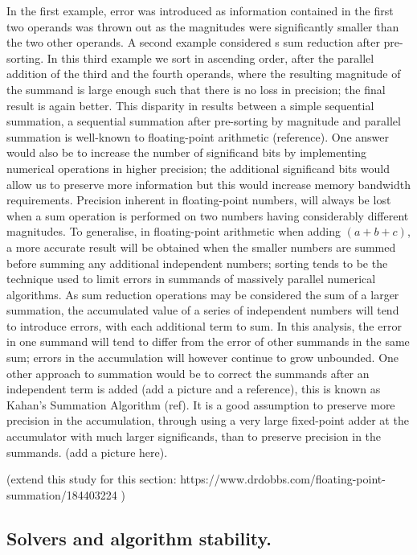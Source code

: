 \documentclass[7pt]{article}
\begin{document}
 In the first example, error was introduced as information contained in the first two operands was thrown out as the magnitudes were significantly smaller than the two other operands. A second example considered s sum reduction after pre-sorting. In this third example we sort in ascending order, after the parallel addition of the third and the fourth operands, where the resulting magnitude of the summand is large enough such that there is no loss in precision; the final result is again better. This disparity in results between a simple sequential summation, a sequential summation after pre-sorting by magnitude and parallel summation is well-known to floating-point arithmetic (reference).  One answer would also be to increase the number of significand bits by implementing numerical operations in higher precision; the additional significand bits would allow us to preserve more information but this would increase memory bandwidth requirements. Precision inherent in floating-point numbers, will always be lost when a sum operation is performed on two numbers having considerably different magnitudes. To generalise, in floating-point arithmetic when adding $(a + b + c)$, a more accurate result will be obtained when the smaller numbers are summed before summing any additional independent numbers; sorting tends to be the technique used to limit errors in  summands of massively parallel numerical algorithms. As sum reduction operations may be considered the sum of a larger summation, the accumulated value of a series of independent numbers will tend to introduce errors, with each additional term to sum. In this analysis, the error in one summand will tend to differ from the error of other summands in the same sum; errors in the accumulation will however continue to grow unbounded. One other approach to summation would be to correct the summands after an independent term is added (add a picture and a reference), this is known as Kahan's Summation Algorithm (ref). It is a good assumption to preserve more precision in the accumulation, through using a very large fixed-point adder at the accumulator with much larger significands, than to preserve precision in the summands. (add a picture here).

(extend this study for this section:
https://www.drdobbs.com/floating-point-summation/184403224
)

\subsection*{Solvers and algorithm stability.}
\end{document}
